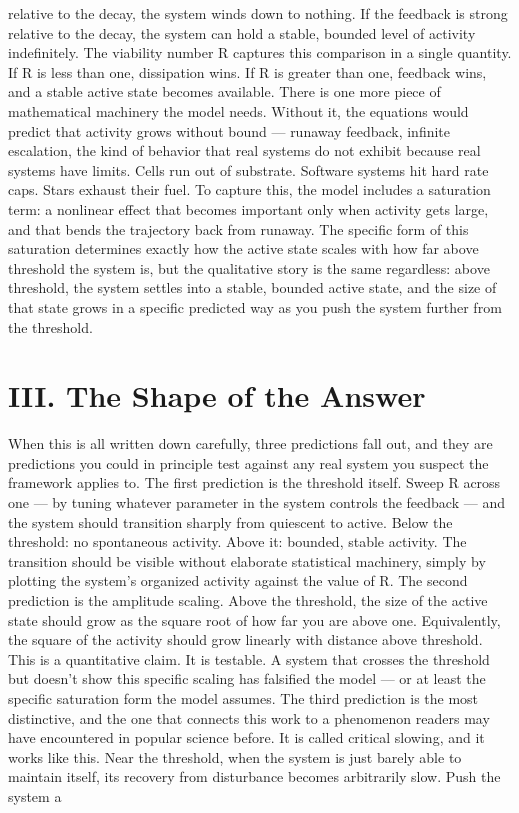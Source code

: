 \documentclass[12pt]{article}
\begin{document}
relative to the decay, the system winds down to nothing. If the feedback is strong relative to the decay, the system can hold a stable, bounded level of activity indefinitely. The viability number R captures this comparison in a single quantity. If R is less than one, dissipation wins. If R is greater than one, feedback wins, and a stable active state becomes available. There is one more piece of mathematical machinery the model needs. Without it, the equations would predict that activity grows without bound --- runaway feedback, infinite escalation, the kind of behavior that real systems do not exhibit because real systems have limits. Cells run out of substrate. Software systems hit hard rate caps. Stars exhaust their fuel. To capture this, the model includes a saturation term: a nonlinear effect that becomes important only when activity gets large, and that bends the trajectory back from runaway. The specific form of this saturation determines exactly how the active state scales with how far above threshold the system is, but the qualitative story is the same regardless: above threshold, the system settles into a stable, bounded active state, and the size of that state grows in a specific predicted way as you push the system further from the threshold.


\section*{III. The Shape of the Answer}

When this is all written down carefully, three predictions fall out, and they are predictions you could in principle test against any real system you suspect the framework applies to. The first prediction is the threshold itself. Sweep R across one --- by tuning whatever parameter in the system controls the feedback --- and the system should transition sharply from quiescent to active. Below the threshold: no spontaneous activity. Above it: bounded, stable activity. The transition should be visible without elaborate statistical machinery, simply by plotting the system's organized activity against the value of R. The second prediction is the amplitude scaling. Above the threshold, the size of the active state should grow as the square root of how far you are above one. Equivalently, the square of the activity should grow linearly with distance above threshold. This is a quantitative claim. It is testable. A system that crosses the threshold but doesn't show this specific scaling has falsified the model --- or at least the specific saturation form the model assumes. The third prediction is the most distinctive, and the one that connects this work to a phenomenon readers may have encountered in popular science before. It is called critical slowing, and it works like this. Near the threshold, when the system is just barely able to maintain itself, its recovery from disturbance becomes arbitrarily slow. Push the system a
\end{document}
